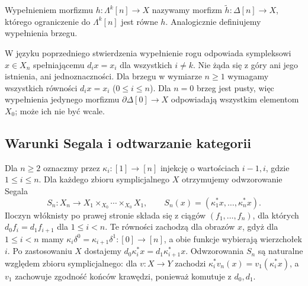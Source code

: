 \begin{definicja}\label{cat:def:horn-filler}
Wypełnieniem morfizmu $h:\Lambda^k[n]\to X$ nazywamy morfizm $\widetilde h:\Delta[n]\to X$, którego ograniczenie do $\Lambda^k[n]$ jest równe $h$. Analogicznie definiujemy wypełnienia brzegu.
\end{definicja}
W języku poprzedniego stwierdzenia wypełnienie rogu odpowiada sympleksowi $x\in X_n$ spełniającemu $d_i x=x_i$ dla wszystkich $i\ne k$. Nie żąda się z góry ani jego istnienia, ani jednoznaczności. Dla brzegu w wymiarze $n\geq1$ wymagamy wszystkich równości $d_i x=x_i$ ($0\leq i\leq n$). Dla $n=0$ brzeg jest pusty, więc wypełnienia jedynego morfizmu $\partial\Delta[0]\to X$ odpowiadają wszystkim elementom $X_0$; może ich nie być wcale.

\subsection{Warunki Segala i odtwarzanie kategorii}

Dla $n\geq2$ oznaczmy przez $\kappa_i:[1]\to[n]$ injekcję o wartościach $i-1,i$, gdzie $1\leq i\leq n$. Dla każdego zbioru symplicjalnego $X$ otrzymujemy odwzorowanie Segala
\begin{equation}\label{cat:eq:segal-map}
 S_n:X_n\longrightarrow
 X_1\times_{X_0}\cdots\times_{X_0}X_1,\qquad
 S_n(x)=(\kappa_1^*x,\ldots,\kappa_n^*x).
\end{equation}
Iloczyn włóknisty po prawej stronie składa się z ciągów $(f_1,\ldots,f_n)$, dla których $d_0f_i=d_1f_{i+1}$ dla $1\leq i<n$. Te równości zachodzą dla obrazów $x$, gdyż dla $1\leq i<n$ mamy $\kappa_i\delta^0=\kappa_{i+1}\delta^1:[0]\to[n]$, a obie funkcje wybierają wierzchołek $i$. Po zastosowaniu $X$ dostajemy $d_0\kappa_i^*x=d_1\kappa_{i+1}^*x$. Odwzorowania $S_n$ są naturalne względem zbioru symplicjalnego: dla $v:X\to Y$ zachodzi $\kappa_i^*v_n(x)=v_1(\kappa_i^*x)$, a $v_1$ zachowuje zgodność końców krawędzi, ponieważ komutuje z $d_0,d_1$.

